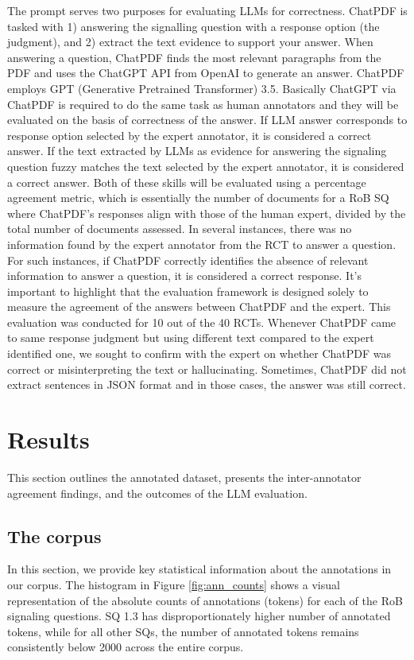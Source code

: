 \documentclass[sn-mathphys,Numbered]{sn-jnl}%
\theoremstyle{thmstyleone}%
\theoremstyle{thmstyletwo}%
\theoremstyle{thmstylethree}%
\begin{document}
The prompt serves two purposes for evaluating LLMs for correctness.
ChatPDF is tasked with 1) answering the signalling question with a response option (the judgment), and 2) extract the text evidence to support your answer.
When answering a question, ChatPDF finds the most relevant paragraphs from the PDF and uses the ChatGPT API from OpenAI to generate an answer.
ChatPDF employs GPT (Generative Pretrained Transformer) 3.5.
Basically ChatGPT via ChatPDF is required to do the same task as human annotators and they will be evaluated on the basis of correctness of the answer.
If LLM answer corresponds to response option selected by the expert annotator, it is considered a correct answer. 
If the text extracted by LLMs as evidence for answering the signaling question fuzzy matches the text selected by the expert annotator, it is considered a correct answer.
Both of these skills will be evaluated using a percentage agreement metric, which is essentially the number of documents for a RoB SQ where ChatPDF's responses align with those of the human expert, divided by the total number of documents assessed.
In several instances, there was no information found by the expert annotator from the RCT to answer a question. 
For such instances, if ChatPDF correctly identifies the absence of relevant information to answer a question, it is considered a correct response.
It's important to highlight that the evaluation framework is designed solely to measure the agreement of the answers between ChatPDF and the expert.
This evaluation was conducted for 10 out of the 40 RCTs.
Whenever ChatPDF came to same response judgment but using different text compared to the expert identified one, we sought to confirm with the expert on whether ChatPDF was correct or misinterpreting the text or hallucinating.
Sometimes, ChatPDF did not extract sentences in JSON format and in those cases, the answer was still correct. %
%
%
%
\section{Results}
\label{sec:results}
%
This section outlines the annotated dataset, presents the inter-annotator agreement findings, and the outcomes of the LLM evaluation.
%
%
%
\subsection{The corpus}
\label{subsec:corpus}
%
In this section, we provide key statistical information about the annotations in our corpus.
The histogram in Figure \ref{fig:ann_counts} shows a visual representation of the absolute counts of annotations (tokens) for each of the RoB signaling questions.
SQ 1.3 has disproportionately higher number of annotated tokens, while for all other SQs, the number of annotated tokens remains consistently below 2000 across the entire corpus.
\end{document}
